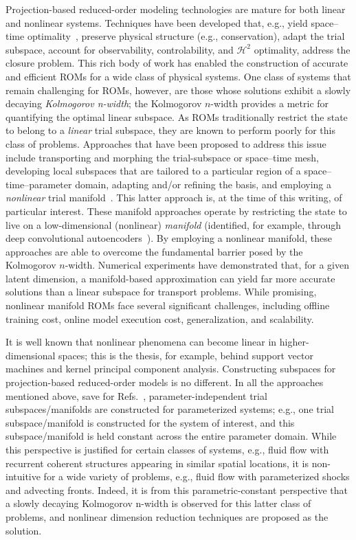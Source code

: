 \documentclass[3p,computermodern,10pt]{elsarticle}
\begin{document}
Projection-based reduced-order modeling technologies are mature for both linear and nonlinear systems. Techniques have been developed that, e.g., yield space--time optimality~\cite{choi_stlspg,constantine_strom,yuki_stlspg,parish_wls,townePOD}, preserve physical structure (e.g., conservation), adapt the trial subspace, account for observability, controlability, and $\mathcal{H}^2$ optimality, address the closure problem. This rich body of work has enabled the construction of accurate and efficient ROMs for a wide class of physical systems. One class of systems that remain challenging for ROMs, however, are those whose solutions exhibit a slowly decaying \textit{Kolmogorov n-width}; the Kolmogorov $n$-width provides a metric for quantifying the optimal linear subspace. As ROMs traditionally restrict the state to belong to a \textit{linear} trial subspace, they are known to perform poorly for this class of problems. Approaches that have been proposed to address this issue include transporting and morphing the trial-subspace or space--time mesh, developing local subspaces that are tailored to a particular region of a space--time--parameter domain, adapting and/or refining the basis, and employing a \textit{nonlinear} trial manifold~\cite{LeeCarlberg,kim2020fast}. This latter approach is, at the time of this writing, of particular interest. These manifold approaches operate by restricting the state to live on a low-dimensional (nonlinear) \textit{manifold} (identified, for example, through deep convolutional autoencoders~\cite{LeeCarlberg}). By employing a nonlinear manifold, these approaches are able to overcome the fundamental barrier posed by the Kolmogorov $n$-width. Numerical experiments have demonstrated that, for a given latent dimension, a manifold-based approximation can yield far more accurate solutions than a linear subspace for transport problems. While promising, nonlinear manifold ROMs face several significant challenges, including offline training cost, online model execution cost, generalization, and scalability. 

It is well known that nonlinear phenomena can become linear in higher-dimensional spaces; this is the thesis, for example, behind support vector machines and kernel principal component analysis. Constructing subspaces for projection-based reduced-order models is no different. In all the approaches mentioned above, save for Refs.~\cite{}, parameter-independent trial subspaces/manifolds are constructed for parameterized systems; e.g., one trial subspace/manifold is constructed for the system of interest, and this subspace/manifold is held constant across the entire parameter domain. While this perspective is justified for certain classes of systems, e.g., fluid flow with recurrent coherent structures appearing in similar spatial locations, it is non-intuitive for a wide variety of problems, e.g., fluid flow with parameterized shocks and advecting fronts.  Indeed, it is from this parametric-constant perspective that a slowly decaying Kolmogorov n-width is observed for this latter class of problems, and nonlinear dimension reduction techniques are proposed as the solution.
\end{document}
